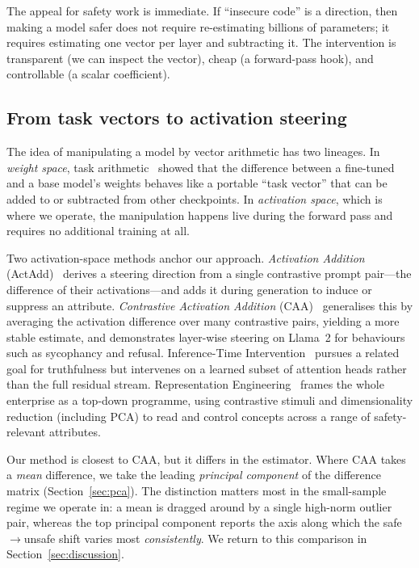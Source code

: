 \documentclass[11pt,a4paper]{article}
\begin{document}
The appeal for safety work is immediate. If ``insecure code'' is a direction, then making a model safer does not require re-estimating billions of parameters; it requires estimating one vector per layer and subtracting it. The intervention is transparent (we can inspect the vector), cheap (a forward-pass hook), and controllable (a scalar coefficient).

\subsection{From task vectors to activation steering}
The idea of manipulating a model by vector arithmetic has two lineages. In \emph{weight space}, task arithmetic~\cite{ilharco2023task} showed that the difference between a fine-tuned and a base model's weights behaves like a portable ``task vector'' that can be added to or subtracted from other checkpoints. In \emph{activation space}, which is where we operate, the manipulation happens live during the forward pass and requires no additional training at all.

Two activation-space methods anchor our approach. \emph{Activation Addition} (ActAdd)~\cite{turner2023actadd} derives a steering direction from a single contrastive prompt pair---the difference of their activations---and adds it during generation to induce or suppress an attribute. \emph{Contrastive Activation Addition} (CAA)~\cite{rimsky2024caa} generalises this by averaging the activation difference over many contrastive pairs, yielding a more stable estimate, and demonstrates layer-wise steering on Llama~2 for behaviours such as sycophancy and refusal. Inference-Time Intervention~\cite{li2023iti} pursues a related goal for truthfulness but intervenes on a learned subset of attention heads rather than the full residual stream. Representation Engineering~\cite{zou2023repe} frames the whole enterprise as a top-down programme, using contrastive stimuli and dimensionality reduction (including PCA) to read and control concepts across a range of safety-relevant attributes.

Our method is closest to CAA, but it differs in the estimator. Where CAA takes a \emph{mean} difference, we take the leading \emph{principal component} of the difference matrix (Section~\ref{sec:pca}). The distinction matters most in the small-sample regime we operate in: a mean is dragged around by a single high-norm outlier pair, whereas the top principal component reports the axis along which the safe$\rightarrow$unsafe shift varies most \emph{consistently}. We return to this comparison in Section~\ref{sec:discussion}.
\end{document}
